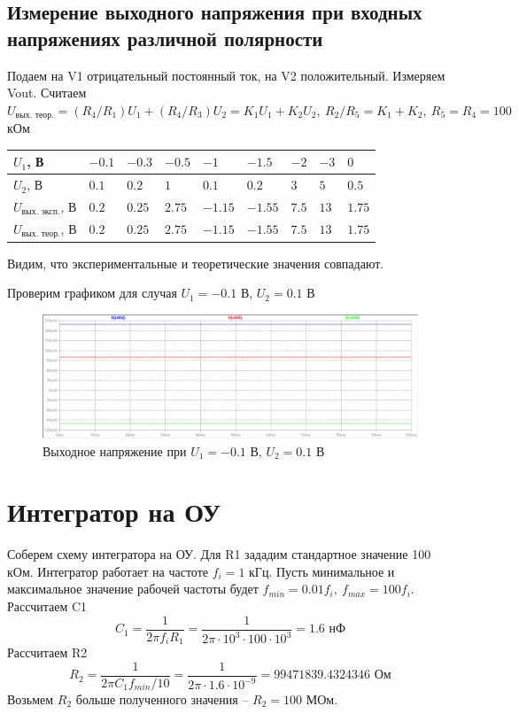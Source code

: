 \documentclass[a4paper, 12pt]{article}
\begin{document}
    \subsection{Измерение выходного напряжения при входных напряжениях различной полярности}
    Подаем на V1 отрицательный постоянный ток, на V2 положительный. Измеряем Vout. Считаем
    $U_{\text{вых. теор.}}=\left(R_4/R_1\right)U_1+\left(R_4/R_3\right)U_2=K_1U_1+K_2U_2,\ R_2/R_5=K_1+K_2,\ R_5=R_4=100$ кОм
    \begin{center}
        \begin{tabular}{ | m{5.5em} | m{2.5em}| m{2.5em} | m{2.5em} | m{3em} | m{3em} | m{2.5em} | m{2.5em} | m{2.5em} | } 
        \hline
        $U_1$, В& $-0.1$ &$-0.3$ &$-0.5$ &$-1$& $-1.5$ & $-2$ & $-3$ &$0$\\ 
        \hline
        $U_2$, В& $0.1$ &$0.2$ &$1$ &$0.1$& $0.2$ & $3$ &$5$ &$0.5$\\ 
        \hline
        $U_{\text{вых. эксп.}}$, В& $0.2$ &$0.25$ &$2.75$ &$-1.15$& $-1.55$ & $7.5$ &$13$ &$1.75$\\
        \hline
        $U_{\text{вых. теор.}}$, В& $0.2$ &$0.25$ &$2.75$ &$-1.15$& $-1.55$ & $7.5$& $13$ &$1.75$\\
        \hline
        \end{tabular}
    \end{center}
    Видим, что экспериментальные и теоретические значения совпадают.


    Проверим графиком для случая $U_1=-0.1$ В, $U_2=0.1$ В
    \begin{figure}[H]
        \centering
        \includegraphics[scale=0.46]{scheme5_check.png}
        \captionsetup{skip=0pt}
        \caption{Выходное напряжение при $U_1=-0.1$ В, $U_2=0.1$ В}
        \label{fig:scheme5_check}
    \end{figure}


    \section{Интегратор на ОУ}
    Соберем схему интегратора на ОУ. Для R1 зададим стандартное значение 100 кОм.
    Интегратор работает на частоте $f_i=1$ кГц. Пусть минимальное и максимальное
    значение рабочей частоты будет $f_{min}=0.01f_i,\ f_{max}=100f_i$. Рассчитаем C1
    $$
    C_1=\dfrac{1}{2\pi f_i R_1}=\dfrac{1}{2\pi\cdot10^3\cdot100\cdot10^3}=1.6\text{ нФ}
    $$
    Рассчитаем R2
    $$
    R_2=\dfrac{1}{2\pi C_1 f_{min}/10}=\dfrac{1}{2\pi\cdot1.6\cdot10^{-9}}=99471839.4324346\text{ Ом}
    $$
    Возьмем $R_2$ больше полученного значения -- $R_2=100$ МОм.
    
\end{document}
